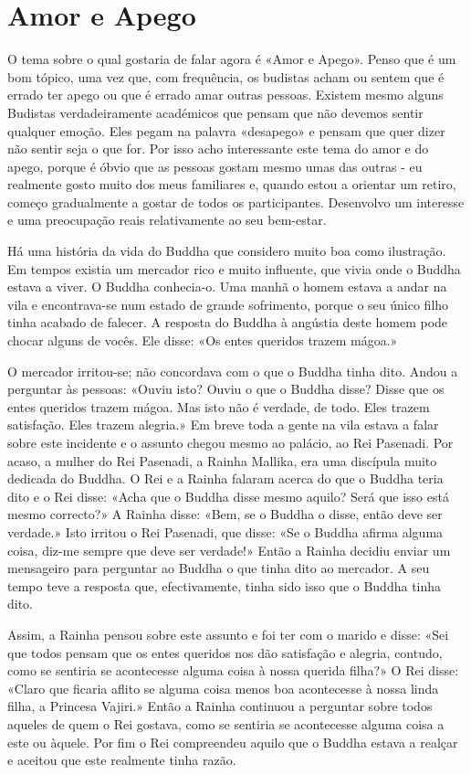 \chapter{Amor e Apego}

O tema sobre o qual gostaria de falar agora é «Amor e Apego». Penso que
é um bom tópico, uma vez que, com frequência, os budistas acham ou
sentem que é errado ter apego ou que é errado amar outras pessoas.
Existem mesmo alguns Budistas verdadeiramente académicos que pensam que
não devemos sentir qualquer emoção. Eles pegam na palavra «desapego» e
pensam que quer dizer não sentir seja o que for. Por isso acho
interessante este tema do amor e do apego, porque é óbvio que as pessoas
gostam mesmo umas das outras - eu realmente gosto muito dos meus
familiares e, quando estou a orientar um retiro, começo gradualmente a
gostar de todos os participantes. Desenvolvo um interesse e uma
preocupação reais relativamente ao seu \mbox{bem-estar}.

Há uma história da vida do Buddha que considero muito boa como
ilustração. Em tempos existia um mercador rico e muito influente, que
vivia onde o Buddha estava a viver. O Buddha conhecia-o. Uma manhã o
homem estava a andar na vila e encontrava-se num estado de grande
sofrimento, porque o seu único filho tinha acabado de falecer. A
resposta do Buddha à angústia deste homem pode chocar alguns de vocês.
Ele disse: «Os entes queridos trazem mágoa.»

O mercador irritou-se; não concordava com o que o Buddha tinha dito.
Andou a perguntar às pessoas: «Ouviu isto? Ouviu o que o Buddha disse?
Disse que os entes queridos trazem mágoa. Mas isto não é verdade, de
todo. Eles trazem satisfação. Eles trazem alegria.» Em breve toda a
gente na vila estava a falar sobre este incidente e o assunto chegou
mesmo ao palácio, ao Rei Pasenadi. Por acaso, a mulher do Rei Pasenadi,
a Rainha Mallika, era uma discípula muito dedicada do Buddha. O Rei e a
Rainha falaram acerca do que o Buddha teria dito e o Rei disse: «Acha
que o Buddha disse mesmo aquilo? Será que isso está mesmo correcto?» A
Rainha disse: «Bem, se o Buddha o disse, então deve ser verdade.» Isto
irritou o Rei Pasenadi, que disse: «Se o Buddha afirma alguma coisa,
diz-me sempre que deve ser verdade!» Então a Rainha decidiu enviar um
mensageiro para perguntar ao Buddha o que tinha dito ao mercador. A seu
tempo teve a resposta que, efectivamente, tinha sido isso que o Buddha
tinha dito.

Assim, a Rainha pensou sobre este assunto e foi ter com o marido e
disse: «Sei que todos pensam que os entes queridos nos dão satisfação e
alegria, contudo, como se sentiria se acontecesse alguma coisa à nossa
querida filha?» O Rei disse: «Claro que ficaria aflito se alguma coisa
menos boa acontecesse à nossa linda filha, a Princesa Vajiri.» Então a
Rainha continuou a perguntar sobre todos aqueles de quem o Rei gostava,
como se sentiria se acontecesse alguma coisa a este ou àquele. Por fim o
Rei compreendeu aquilo que o Buddha estava a realçar e aceitou que este
realmente tinha razão.

